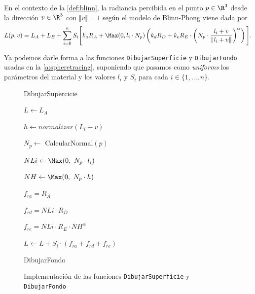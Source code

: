 \begin{definicion}
    En el contexto de la \autoref{def:blinn}, la radiancia percibida en el punto $p\in\R^3$ desde la dirección $v\in\R^3$ con $\Vert v \Vert = 1$ según el modelo de Blinn-Phong viene dada por
    \begin{equation*}
        L(p,v) = L_A+L_E+ \sum_{i=0}^n S_i \Bigg[ k_aR_A + \Max(0,l_i\cdot N_p) \left( k_dR_D + k_eR_E\cdot \left(N_p\cdot \frac{l_i + v}{\Vert l_i + v\Vert} \right)^{\alpha} \right) \Bigg].
    \end{equation*}
\end{definicion}

Ya podemos darle forma a las funciones \texttt{DibujarSuperficie} y \texttt{DibujarFondo} usadas en la \autoref{a:spheretracing}, suponiendo que pasamos como \textit{uniforms} los parámetros del material y los valores $l_i$ y $S_i$ para cada $i\in \{1,\dots, n\}$.
\begin{figure}[ht!]
    \centering
    
       \begin{algorithm}[H]
            \caption{DibujarSupercicie}
                $L \gets L_A$ 
                 {

                    
                    $h \gets normalizar(L_i - v)$ 
                    
                    $N_p \gets$ CalcularNormal$(p)$
                    
                    $NLi \gets \Max(0,\ N_p\cdot l_i)$
                    
                    $NH \gets \Max(0,\ N_p \cdot h)$\newline

                    $f_{ra} = R_A$
                    
                    $f_{rd} = NLi\cdot R_D$
                    
                    $f_{re} = NLi \cdot R_E \cdot NH^{\alpha}$\newline

                    $L \gets L + S_i\cdot (f_{ra} + f_{rd} + f_{re})$
                }

        \end{algorithm}
    \begin{algorithm}[H]
            \caption{DibujarFondo}
        \end{algorithm}

        \caption{Implementación de las funciones \texttt{DibujarSuperficie} y \texttt{DibujarFondo}}
\end{figure}

